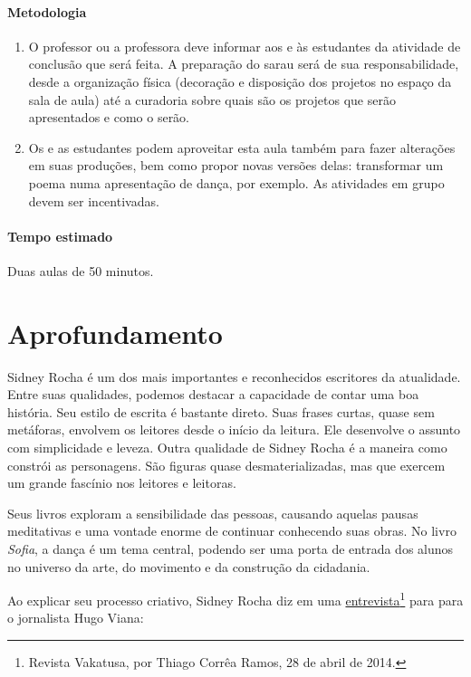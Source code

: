 \documentclass[12pt]{extarticle}
\begin{document}
\paragraph{Metodologia}

\begin{enumerate}

  \item
  O professor ou a professora deve informar aos e às estudantes da atividade de conclusão que será feita.
  A preparação do sarau será de sua responsabilidade, desde a organização física
  (decoração e disposição dos projetos no espaço da sala de aula) até a curadoria
  sobre quais são os projetos que serão apresentados e como o serão.

  \item Os e as estudantes
  podem aproveitar esta aula também para fazer alterações em suas produções, bem 
  como propor novas versões delas: transformar um poema numa apresentação de dança, por exemplo.
  As atividades em grupo devem ser incentivadas. 

\end{enumerate}

\paragraph{Tempo estimado} Duas aulas de 50 minutos.


\section{Aprofundamento}

Sidney Rocha é um dos mais importantes e reconhecidos
escritores da atualidade. Entre suas qualidades, podemos destacar a capacidade
de contar uma boa história. Seu estilo de escrita é bastante direto. Suas
frases curtas, quase sem metáforas, envolvem os leitores desde o início da
leitura. Ele desenvolve o assunto com simplicidade e leveza. Outra qualidade de
Sidney Rocha é a maneira como constrói as personagens. São figuras quase
desmaterializadas, mas que exercem um grande fascínio nos leitores e leitoras. 

Seus livros exploram a sensibilidade das pessoas, causando aquelas pausas
meditativas e uma vontade enorme de continuar conhecendo suas obras.  No livro
\textit{Sofia}, a dança é um tema central, podendo ser uma porta de entrada dos alunos
no universo da arte, do movimento e da construção da cidadania. 

Ao explicar seu processo criativo, Sidney Rocha diz em uma 
\href{http://www.vacatussa.com/entrevista-sidney-rocha/}{entrevista}\footnote{
  Revista Vakatusa, por Thiago Corrêa Ramos, 28 de abril de 2014.} para para 
o jornalista Hugo Viana:
\end{document}
